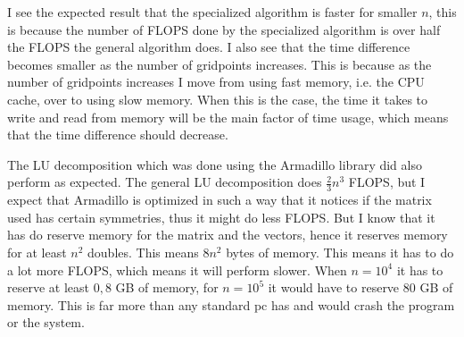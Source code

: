 \documentclass[12pt]{article}
\begin{document}
{
\centering
{}

\hfill\break
}
I see the expected result that the specialized algorithm is faster for smaller $n$, this is because the number of FLOPS done by the specialized algorithm is over half the FLOPS the general algorithm does. I also see that the time difference becomes smaller as the number of gridpoints increases. This is because as the number of gridpoints increases I move from using fast memory, i.e. the CPU cache, over to using slow memory. When this is the case, the time it takes to write and read from memory will be the main factor of time usage, which means that the time difference should decrease.
\hfill\break

The LU decomposition which was done using the Armadillo library did also perform as expected. The general LU decomposition does $\frac{2}{3}n^3$ FLOPS, but I expect that Armadillo is optimized in such a way that it notices if the matrix used has certain symmetries, thus it might do less FLOPS. But I know that it has do reserve memory for the matrix and the vectors, hence it reserves memory for at least $n^2$ doubles. This means $8 n^2$ bytes of memory. This means it has to do a lot more FLOPS, which means it will perform slower. When $n=10^4$ it has to reserve at least $0,8$ GB of memory, for $n=10^5$ it would have to reserve 80 GB of memory. This is far more than any standard pc has and would crash the program or the system.
\hfill\break
\end{document}
